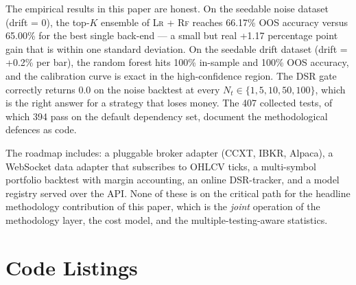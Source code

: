 \documentclass[11pt,a4paper]{article}
\let\oldsection\section
\renewcommand{\section}{\clearpage\oldsection}
\providecommand{\dsr}{\textsc{DSR}}
\providecommand{\rf}{\textsc{Rf}}
\providecommand{\lr}{\textsc{Lr}}
\begin{document}
The empirical results in this paper are honest. On the
seedable noise dataset (drift = 0), the top-$K$ ensemble
of \lr{} + \rf{} reaches 66.17\% OOS accuracy versus
65.00\% for the best single back-end --- a small but
real +1.17 percentage point gain that is within one
standard deviation. On the seedable drift dataset
(drift = +0.2\% per bar), the random forest hits 100\%
in-sample and 100\% OOS accuracy, and the calibration
curve is exact in the high-confidence region. The
\dsr{} gate correctly returns 0.0 on the noise
backtest at every $N_t \in \{1, 5, 10, 50, 100\}$,
which is the right answer for a strategy that loses
money. The 407 collected tests, of which 394 pass on
the default dependency set, document the
methodological defences as code.

The roadmap includes: a pluggable broker adapter
(CCXT, IBKR, Alpaca), a WebSocket data adapter that
subscribes to OHLCV ticks, a multi-symbol portfolio
backtest with margin accounting, an online DSR-tracker,
and a model registry served over the API. None of these
is on the critical path for the headline methodology
contribution of this paper, which is the \emph{joint}
operation of the methodology layer, the cost model, and
the multiple-testing-aware statistics.

\appendix
\section{Code Listings}\label{app:code}
\end{document}
